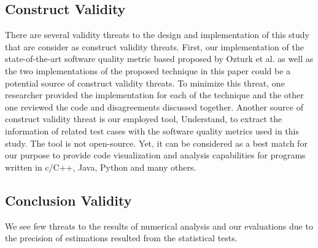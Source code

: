 \documentclass{sig-alternate}
\begin{document}
\subsection{Construct Validity}
There are several validity threats to the design and implementation of this study that are consider as construct validity threats. First, our implementation of the state-of-the-art software quality metric based proposed by Ozturk et al. as well as the two implementations of the proposed technique in this paper could be a potential source of construct validity threats. To minimize this threat, one researcher provided the implementation for each of the technique and the other one reviewed the code and disagreements discussed together. Another source of construct validity threat is our employed tool, Understand, to extract the information of related test cases with the software quality metrics used in this study. The tool is not open-source. Yet, it can be considered as a best match for our purpose to provide code visualization and analysis capabilities for programs written in c/C++, Java, Python and many others.
\begin{comment}
\begin{itemize}
\item  implementation of other SQM based TCP technique.
\item code coverage extraction tool.
\item Faulty versions

There are several validity threats to the design of this study.
Our choice of..
should of course..
this would allow.....would give...

During data collection we mostly used a...

Another threat to the data collection is that our chosen...

did not always fit..

Since we had no...
\end{comment}
\subsection{Conclusion Validity}
We see few threats to the results of numerical analysis and our evaluations due to the precision of estimations resulted from the statistical tests. 
\end{document}
